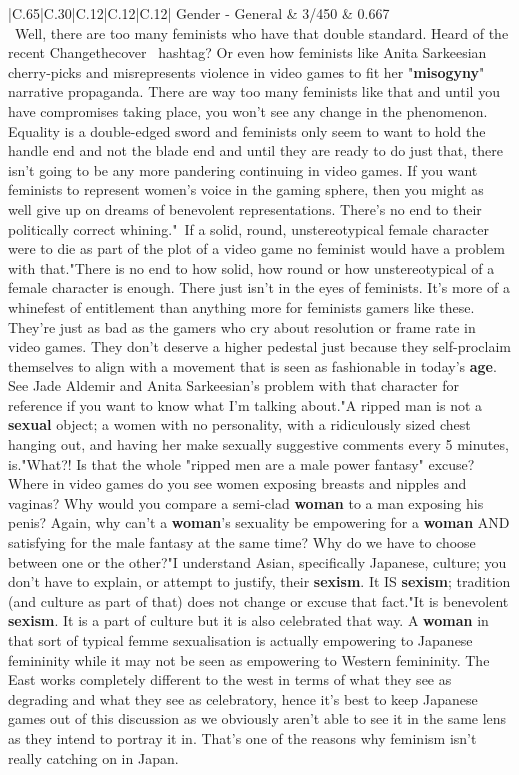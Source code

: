 \documentclass[11pt]{article}
\newlength\mylength
\begin{document}
\begin{center}
\begin{longtable}{|C{.65\mylength}|C{.30\mylength}|C{.12\mylength}|C{.12\mylength}|C{.12\mylength}|}
Gender - General & 3/450 & 0.667 \\  \hline
  \small \@chapachuu Well, there are too many feminists who have that double standard. Heard of the recent  Changethecover  hashtag? Or even how feminists like Anita Sarkeesian cherry-picks and misrepresents violence in video games to fit her "\textbf{misogyny}" narrative propaganda. There are way too many feminists like that and until you have compromises taking place, you won't see any change in the phenomenon. Equality is a double-edged sword and feminists only seem to want to hold the handle end and not the blade end and until they are ready to do just that, there isn't going to be any more pandering continuing in video games. If you want feminists to represent women's voice in the gaming sphere, then you might as well give up on dreams of benevolent representations. There's no end to their politically correct whining." If a solid, round, unstereotypical female character were to die as part of the plot of a video game no feminist would have a problem with that."There is no end to how solid, how round or how unstereotypical of a female character is enough. There just isn't in the eyes of feminists. It's more of a whinefest of entitlement than anything more for feminists gamers like these. They're just as bad as the gamers who cry about resolution or frame rate in video games. They don't deserve a higher pedestal just because they self-proclaim themselves to align with a movement that is seen as fashionable in today's \textbf{age}. See Jade Aldemir and Anita Sarkeesian's problem with that character for reference if you want to know what I'm talking about."A ripped man is not a \textbf{sexual} object; a women with no personality, with a ridiculously sized chest hanging out, and having her make sexually suggestive comments every 5 minutes, is."What?! Is that the whole "ripped men are a male power fantasy" excuse? Where in video games do you see women exposing breasts and nipples and vaginas? Why would you compare a semi-clad \textbf{woman} to a man exposing his penis? Again, why can't a \textbf{woman}'s sexuality be empowering for a \textbf{woman} AND satisfying for the male fantasy at the same time? Why do we have to choose between one or the other?"I understand Asian, specifically Japanese, culture; you don't have to explain, or attempt to justify, their \textbf{sexism}. It IS \textbf{sexism}; tradition (and culture as part of that) does not change or excuse that fact."It is benevolent \textbf{sexism}. It is a part of culture but it is also celebrated that way. A \textbf{woman} in that sort of typical femme sexualisation is actually empowering to Japanese femininity while it may not be seen as empowering to Western femininity. The East works completely different to the west in terms of what they see as degrading and what they see as celebratory, hence it's best to keep Japanese games out of this discussion as we obviously aren't able to see it in the same lens as they intend to portray it in. That's one of the reasons why feminism isn't really catching on in Japan. 
\end{longtable}
\end{center}
\end{document}
